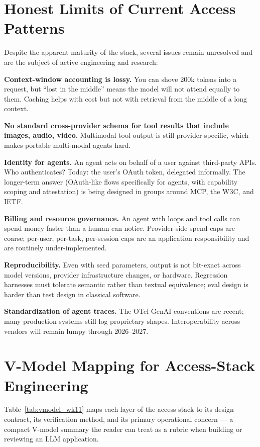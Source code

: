 \section{Honest Limits of Current Access Patterns}

Despite the apparent maturity of the stack, several issues
remain unresolved and are the subject of active engineering and
research:

\textbf{Context-window accounting is lossy.} You can shove 200k
tokens into a request, but ``lost in the middle''
\citep{liu2024lost} means the model will not attend equally to
them. Caching helps with cost but not with retrieval from the
middle of a long context.

\textbf{No standard cross-provider schema for tool results that
include images, audio, video.} Multimodal tool output is still
provider-specific, which makes portable multi-modal agents hard.

\textbf{Identity for agents.} An agent acts on behalf of a user
against third-party APIs. Who authenticates? Today: the user's
OAuth token, delegated informally. The longer-term answer
(OAuth-like flows specifically for agents, with capability
scoping and attestation) is being designed in groups around MCP,
the W3C, and IETF.

\textbf{Billing and resource governance.} An agent with loops
and tool calls can spend money faster than a human can notice.
Provider-side spend caps are coarse; per-user, per-task,
per-session caps are an application responsibility and are
routinely under-implemented.

\textbf{Reproducibility.} Even with seed parameters, output is
not bit-exact across model versions, provider infrastructure
changes, or hardware. Regression harnesses must tolerate
semantic rather than textual equivalence; eval design is harder
than test design in classical software.

\textbf{Standardization of agent traces.} The OTel GenAI
conventions are recent; many production systems still log
proprietary shapes. Interoperability across vendors will remain
lumpy through 2026--2027.

\section{V-Model Mapping for Access-Stack Engineering}

Table~\ref{tab:vmodel_wk11} maps each layer of the access stack
to its design contract, its verification method, and its primary
operational concern --- a compact V-model summary the reader can
treat as a rubric when building or reviewing an LLM application.

